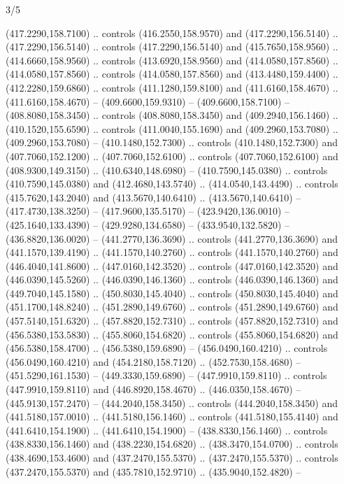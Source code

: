 \begin{flagdescription}{3/5}
\begin{scope}[shift={(0.5\flaglength,0.5\flagwidth)},scale=\flagwidth/510]
\begin{scope}[y=0.80pt, x=0.80pt, yscale=-1.06, xscale=1.06,yshift=-240pt,xshift=-400pt]
\begin{scope}[cm={{0.83333,0.0,0.0,0.83333,(154.64672,48.64761)}}]
\begin{scope}[cm={{0.93334,0.0,0.0,0.93334,(-4.86471,22.64035)}}]
\begin{scope}[line width=0.489\lw]
\begin{scope}[draw=c003300,fill=c338a00]
  (417.2290,158.7100) .. controls (416.2550,158.9570) and (417.2290,156.5140) ..
  (417.2290,156.5140) .. controls (417.2290,156.5140) and (415.7650,158.9560) ..
  (414.6660,158.9560) .. controls (413.6920,158.9560) and (414.0580,157.8560) ..
  (414.0580,157.8560) .. controls (414.0580,157.8560) and (413.4480,159.4400) ..
  (412.2280,159.6860) .. controls (411.1280,159.8100) and (411.6160,158.4670) ..
  (411.6160,158.4670) -- (409.6600,159.9310) -- (409.6600,158.7100) --
  (408.8080,158.3450) .. controls (408.8080,158.3450) and (409.2940,156.1460) ..
  (410.1520,155.6590) .. controls (411.0040,155.1690) and (409.2960,153.7080) ..
  (409.2960,153.7080) -- (410.1480,152.7300) .. controls (410.1480,152.7300) and
  (407.7060,152.1200) .. (407.7060,152.6100) .. controls (407.7060,152.6100) and
  (408.9300,149.3150) .. (410.6340,148.6980) -- (410.7590,145.0380) .. controls
  (410.7590,145.0380) and (412.4680,143.5740) .. (414.0540,143.4490) .. controls
  (415.7620,143.2040) and (413.5670,140.6410) .. (413.5670,140.6410) --
  (417.4730,138.3250) -- (417.9600,135.5170) -- (423.9420,136.0010) --
  (425.1640,133.4390) -- (429.9280,134.6580) -- (433.9540,132.5820) --
  (436.8820,136.0020) -- (441.2770,136.3690) .. controls (441.2770,136.3690) and
  (441.1570,139.4190) .. (441.1570,140.2760) .. controls (441.1570,140.2760) and
  (446.4040,141.8600) .. (447.0160,142.3520) .. controls (447.0160,142.3520) and
  (446.0390,145.5260) .. (446.0390,146.1360) .. controls (446.0390,146.1360) and
  (449.7040,145.1580) .. (450.8030,145.4040) .. controls (450.8030,145.4040) and
  (451.1700,148.8240) .. (451.2890,149.6760) .. controls (451.2890,149.6760) and
  (457.5140,151.6320) .. (457.8820,152.7310) .. controls (457.8820,152.7310) and
  (456.5380,153.5830) .. (455.8060,154.6820) .. controls (455.8060,154.6820) and
  (456.5380,158.4700) .. (456.5380,159.6890) -- (456.0490,160.4210) .. controls
  (456.0490,160.4210) and (454.2180,158.7120) .. (452.7530,158.4680) --
  (451.5290,161.1530) -- (449.3330,159.6890) -- (447.9910,159.8110) .. controls
  (447.9910,159.8110) and (446.8920,158.4670) .. (446.0350,158.4670) --
  (445.9130,157.2470) -- (444.2040,158.3450) .. controls (444.2040,158.3450) and
  (441.5180,157.0010) .. (441.5180,156.1460) .. controls (441.5180,155.4140) and
  (441.6410,154.1900) .. (441.6410,154.1900) -- (438.8330,156.1460) .. controls
  (438.8330,156.1460) and (438.2230,154.6820) .. (438.3470,154.0700) .. controls
  (438.4690,153.4600) and (437.2470,155.5370) .. (437.2470,155.5370) .. controls
  (437.2470,155.5370) and (435.7810,152.9710) .. (435.9040,152.4820) --

\end{scope}
\end{scope}
\end{scope}
\end{scope}
\end{scope}
\end{scope}
\end{flagdescription}
